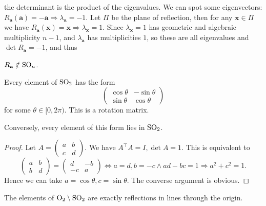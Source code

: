 \documentclass[a4paper]{article}
\begin{document}
the determinant is the product of the eigenvalues. We can spot some
eigenvectors: $ R_\mathbf{a}(\mathbf{a})=-\mathbf{a} \Rightarrow
\lambda_\mathbf{a}=-1 $. Let $ \Pi $ be the plane of reflection, then
for any $ \mathbf{x}\in \Pi $ we have $
R_\mathbf{a}(\mathbf{x})=\mathbf{x} \Rightarrow
\lambda_{\mathbf{x}}=1$. Since $ \lambda_\mathbf{x}=1 $ has geometric
and algebraic multiplicity $n-1$, and $ \lambda_\mathbf{a} $ has
multiplicities $1$, so these are all eigenvalues and $ \det
R_\mathbf{a}=-1 $, and thus
\begin{proposition}\label{prop:7.17}
  $R_\mathbf{a}\notin \mathrm{SO}_n$.
\end{proposition}
\begin{theorem}\label{thm:7.18}
  Every element of $\mathrm{SO}_2$ has the form
  \[
    \begin{pmatrix}
      \cos \theta& -\sin \theta\\
      \sin \theta& \cos \theta
    \end{pmatrix}
  \]
  for some $ \theta\in [0,2\pi) $. This is a rotation matrix.

  Conversely, every element of this form lies in $\mathrm{SO}_2$.
\end{theorem}
\begin{proof}
  Let $A=
  \begin{pmatrix}
    a&b\\c&d
  \end{pmatrix} $.
  We have $ A^\top A=I, \det A=1 $. This is equivalent to
  \[
    \begin{pmatrix}
      a&b\\b&d
    \end{pmatrix}=
    \begin{pmatrix}
      d&-b\\-c&a
    \end{pmatrix} \Longleftrightarrow a=d,b=-c \land ad-bc=1
    \Longrightarrow a^2+c^2=1.
  \]
  Hence we can take $ a=\cos \theta, c=\sin \theta $. The converse
  argument is obvious.
\end{proof}
\begin{theorem}\label{thm:7.19}
  The elements of $ \mathrm{O}_2 \setminus \mathrm{SO}_2 $ are exactly reflections
  in lines through the origin.
\end{theorem}
\end{document}
